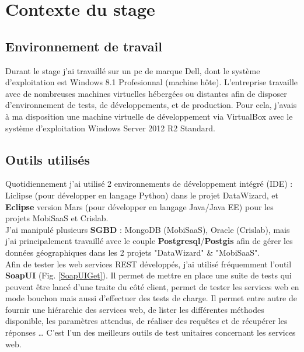 \chapter{Contexte du stage}
\label{AnalyseConception}

\section{Environnement de travail}

Durant le stage j'ai travaillé sur un pc de marque Dell, dont le système d'exploitation est Windows 8.1 Profesionnal (machine hôte). L'entreprise travaille avec de nombreuses machines virtuelles hébergées ou distantes afin de disposer d'environnement de tests, de développements, et de production. Pour cela, j'avais à ma disposition une machine virtuelle de développement via VirtualBox avec le système d'exploitation Windows Server 2012 R2 Standard. \\

\section{Outils utilisés}

Quotidiennement j'ai utilisé 2 environnements de développement intégré (IDE) : Liclipse (pour développer en langage Python) dans le projet DataWizard, et \textbf{Eclipse} version Mars (pour développer en langage Java/Java EE) pour les projets MobiSaaS et Crislab.\\

J'ai manipulé plusieurs \textbf{SGBD} : MongoDB (MobiSaaS), Oracle (Crislab), mais j'ai principalement travaillé avec le couple \textbf{Postgresql}/\textbf{Postgis} afin de gérer les données géographiques dans les 2 projets "DataWizard" \& "MobiSaaS".\\

Afin de tester les web services REST développés, j'ai utilisé fréquemment l'outil \textbf{SoapUI} (Fig. \ref{SoapUIGet}). Il permet de mettre en place une suite de tests qui peuvent être lancé d'une traite du côté client, permet de tester les services web en mode bouchon mais aussi d'effectuer des tests de charge. Il permet entre autre de fournir une hiérarchie des services web, de lister les différentes méthodes disponible, les paramètres attendus, de réaliser des requêtes et de récupérer les réponses … C'est l'un des meilleurs outils de test unitaires concernant les services web.

